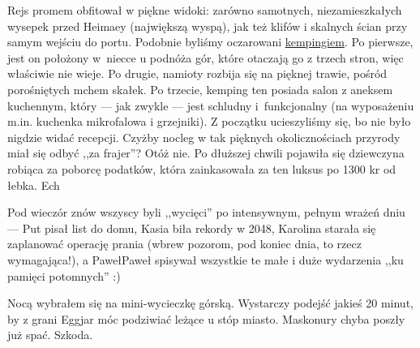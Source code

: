 \pagebreak


Rejs promem obfitował w piękne widoki: zarówno samotnych, niezamieszkałych wysepek przed Heimaey (największą wyspą), jak też klifów i skalnych ścian przy samym wejściu do portu. Podobnie byliśmy oczarowani \href{http://www.tjalda.is/en/herjolfsdalur/}{kempingiem}. Po pierwsze, jest on położony w~niecce u podnóża gór, które otaczają go z trzech stron, więc właściwie nie wieje. Po drugie, namioty rozbija się na pięknej trawie, pośród porośniętych mchem skałek. Po trzecie, kemping ten posiada salon z aneksem kuchennym, który --- jak zwykle --- jest schludny i~funkcjonalny (na wyposażeniu m.in. kuchenka mikrofalowa i grzejniki). Z początku ucieszyliśmy się, bo nie było nigdzie widać recepcji. Czyżby nocleg w tak pięknych okolicznościach przyrody miał się odbyć ,,za frajer''? Otóż nie. Po dłuższej chwili pojawiła się dziewczyna robiąca za poborcę podatków, która zainkasowała za ten luksus po 1300 kr od łebka. Ech\textellipsis

Pod wieczór znów wszyscy byli ,,wycięci'' po intensywnym, pełnym wrażeń dniu --- Put pisał list do domu, Kasia biła rekordy w 2048, Karolina starała się zaplanować operację prania (wbrew pozorom, pod koniec dnia, to rzecz wymagająca!), a Paweł\textellipsis Paweł spisywał wszystkie te małe i duże wydarzenia ,,ku pamięci potomnych'' :)

Nocą wybrałem się na mini-wycieczkę górską. Wystarczy podejść jakieś 20 minut, by z grani Eggjar móc podziwiać leżące u stóp miasto. Maskonury chyba poszły już spać. Szkoda.


